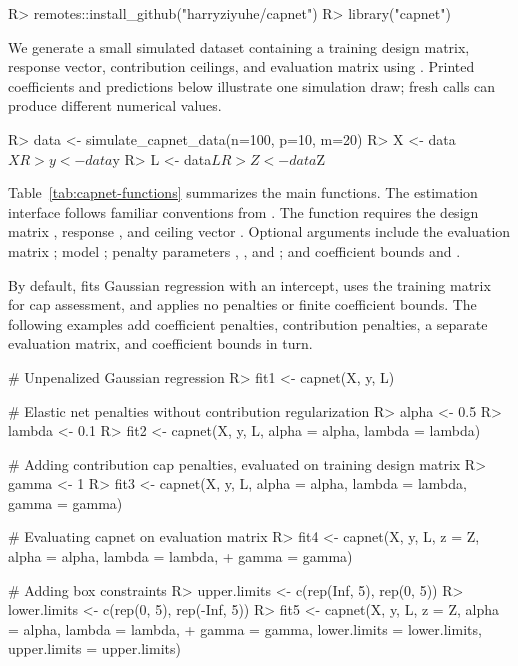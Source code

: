 \documentclass[article,shortnames,nofooter]{jss}
\begin{document}
\begin{Code}
    R> remotes::install_github("harryziyuhe/capnet")
    R> library("capnet")
\end{Code}

We generate a small simulated dataset containing a training design matrix, response vector, contribution ceilings, and evaluation matrix using . Printed coefficients and predictions below illustrate one simulation draw; fresh calls can produce different numerical values.

\begin{Code}
    R> data <- simulate_capnet_data(n=100, p=10, m=20)
    R> X <- data$X
    R> y <- data$y
    R> L <- data$L
    R> Z <- data$Z
\end{Code}

Table~\ref{tab:capnet-functions} summarizes the main functions. The estimation interface follows familiar conventions from  \citep{friedman2010}. The  function requires the design matrix , response , and ceiling vector . Optional arguments include the evaluation matrix ; model ; penalty parameters , , and ; and coefficient bounds  and .

By default,  fits Gaussian regression with an intercept, uses the training matrix for cap assessment, and applies no penalties or finite coefficient bounds. The following examples add coefficient penalties, contribution penalties, a separate evaluation matrix, and coefficient bounds in turn.

\begin{Code}
    # Unpenalized Gaussian regression
    R> fit1 <- capnet(X, y, L)
    
    # Elastic net penalties without contribution regularization
    R> alpha <- 0.5
    R> lambda <- 0.1
    R> fit2 <- capnet(X, y, L, alpha = alpha, lambda = lambda)
    
    # Adding contribution cap penalties, evaluated on training design matrix
    R> gamma <- 1
    R> fit3 <- capnet(X, y, L, alpha = alpha, lambda = lambda, gamma = gamma)
    
    # Evaluating capnet on evaluation matrix
    R> fit4 <- capnet(X, y, L, z = Z, alpha = alpha, lambda = lambda,
    +    gamma = gamma)

    # Adding box constraints
    R> upper.limits <- c(rep(Inf, 5), rep(0, 5))
    R> lower.limits <- c(rep(0, 5), rep(-Inf, 5))
    R> fit5 <- capnet(X, y, L, z = Z, alpha = alpha, lambda = lambda,
    +    gamma = gamma, lower.limits = lower.limits, upper.limits = upper.limits)
\end{Code}
\end{document}
